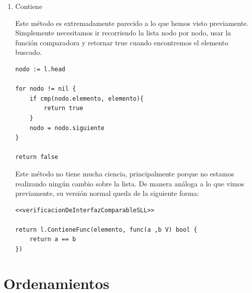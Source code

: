 \documentclass[11pt]{article}
\begin{document}
\begin{enumerate}
\begin{verbatim}
var zero V
if !reflect.TypeOf(&zero).Elem().Comparable() {
	return fmt.Errorf("tipo no comparable")
}
\end{verbatim}
\item Contiene
\label{sec:org9700661}

Este método es extremadamente parecido a lo que hemos visto previamente. Simplemente necesitamos ir recorriendo la lista nodo por nodo, usar la función comparadora y retornar true cuando encontremos el elemento buscado.

\begin{verbatim}
nodo := l.head

for nodo != nil {
	if cmp(nodo.elemento, elemento){
		return true
	}
	nodo = nodo.siguiente
}

return false
\end{verbatim}

Este método no tiene mucha ciencia, principalmente porque no estamos realizando ningún cambio sobre la lista. De manera análoga a lo que vimos previamente, su versión normal queda de la siguiente forma:

\begin{verbatim}
<<verificacionDeInterfazComparableSLL>>

return l.ContieneFunc(elemento, func(a ,b V) bool {
	return a == b
})
\end{verbatim}
\end{enumerate}
\section{Ordenamientos}
\label{sec:org0977dbd}
\end{document}
